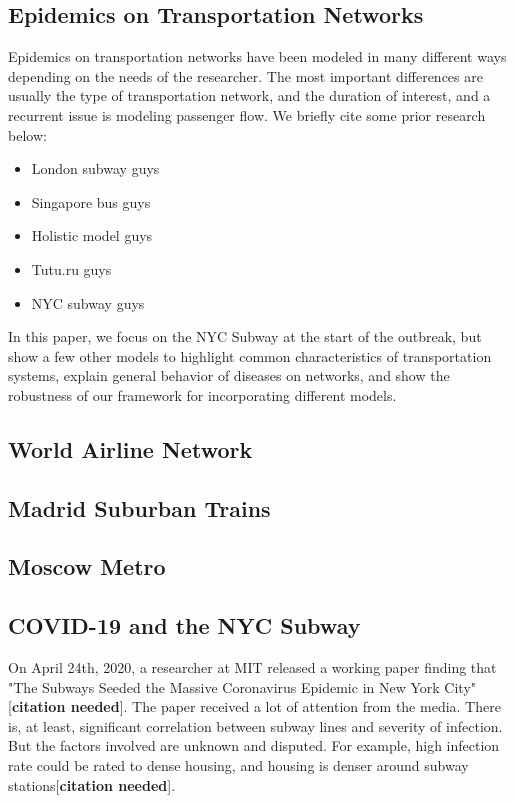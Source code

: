 \documentclass[12pt, a4, epsf] {article}
\theoremstyle{plain}
\theoremstyle{definition}
\begin{document}
\subsection{Epidemics on Transportation Networks}
Epidemics on transportation networks have been modeled in many different ways depending on the needs of the researcher. The most important differences are usually the type of transportation network, and the duration of interest, and a recurrent issue is modeling passenger flow. We briefly cite some prior research below:\\
\begin{itemize}
    \item London subway guys
    \item Singapore bus guys
    \item Holistic model guys
    \item Tutu.ru guys
    \item NYC subway guys
\end{itemize}
In this paper, we focus on the NYC Subway at the start of the outbreak, but show a few other models to highlight common characteristics of transportation systems, explain general behavior of diseases on networks, and show the robustness of our framework for incorporating different models.
\subsection{World Airline Network}
\subsection{Madrid Suburban Trains}
\subsection{Moscow Metro}
\subsection{COVID-19 and the NYC Subway}
On April 24th, 2020, a researcher at MIT released a working paper finding that "The Subways Seeded the Massive Coronavirus Epidemic in New York City"[\textbf{citation needed}]. The paper received a lot of attention from the media. There is, at least, significant correlation between subway lines and severity of infection. But the factors involved are unknown and disputed. For example, high infection rate could be rated to dense housing, and housing is denser around subway stations[\textbf{citation needed}]. 
\end{document}
